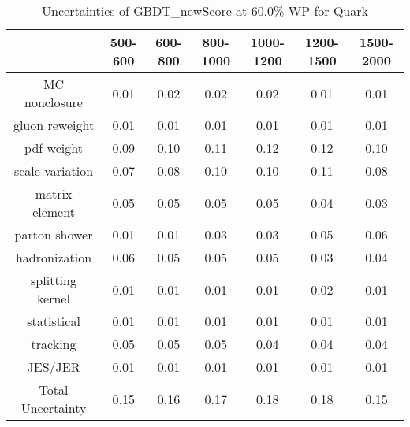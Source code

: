 \begin{table}
\centering
\caption{Uncertainties of GBDT_newScore at 60.0\% WP for Quark}
\label{tab:syst_GBDT_newScore_0.6_Quark}
\begin{tabular}{ccccccc}
\toprule
{} &  500-600 &  600-800 &  800-1000 &  1000-1200 &  1200-1500 &  1500-2000 \\
\midrule
MC nonclosure     &     0.01 &     0.02 &      0.02 &       0.02 &       0.01 &       0.01 \\
gluon reweight    &     0.01 &     0.01 &      0.01 &       0.01 &       0.01 &       0.01 \\
pdf weight        &     0.09 &     0.10 &      0.11 &       0.12 &       0.12 &       0.10 \\
scale variation   &     0.07 &     0.08 &      0.10 &       0.10 &       0.11 &       0.08 \\
matrix element    &     0.05 &     0.05 &      0.05 &       0.05 &       0.04 &       0.03 \\
parton shower     &     0.01 &     0.01 &      0.03 &       0.03 &       0.05 &       0.06 \\
hadronization     &     0.06 &     0.05 &      0.05 &       0.05 &       0.03 &       0.04 \\
splitting kernel  &     0.01 &     0.01 &      0.01 &       0.01 &       0.02 &       0.01 \\
statistical       &     0.01 &     0.01 &      0.01 &       0.01 &       0.01 &       0.01 \\
tracking          &     0.05 &     0.05 &      0.05 &       0.04 &       0.04 &       0.04 \\
JES/JER           &     0.01 &     0.01 &      0.01 &       0.01 &       0.01 &       0.01 \\
Total Uncertainty &     0.15 &     0.16 &      0.17 &       0.18 &       0.18 &       0.15 \\
\bottomrule
\end{tabular}
\end{table}
